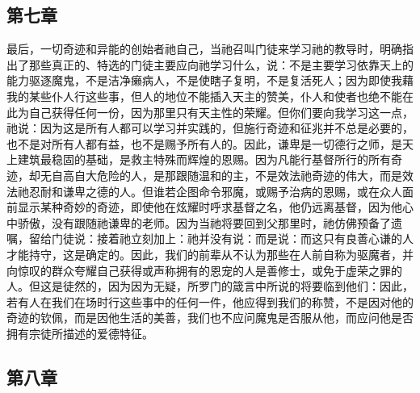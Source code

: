 
\subsection{第七章}

\par

最后，一切奇迹和异能的创始者祂自己，当祂召叫门徒来学习祂的教导时，明确指出了那些真正的、特选的门徒主要应向祂学习什么，说：不是主要学习依靠天上的能力驱逐魔鬼，不是洁净癞病人，不是使瞎子复明，不是复活死人；因为即使我藉我的某些仆人行这些事，但人的地位不能插入天主的赞美，仆人和使者也绝不能在此为自己获得任何一份，因为那里只有天主性的荣耀。但你们要向我学习这一点，祂说：因为这是所有人都可以学习并实践的，但施行奇迹和征兆并不总是必要的，也不是对所有人都有益，也不是赐予所有人的。因此，谦卑是一切德行之师，是天上建筑最稳固的基础，是救主特殊而辉煌的恩赐。因为凡能行基督所行的所有奇迹，却无自高自大危险的人，是那跟随温和的主，不是效法祂奇迹的伟大，而是效法祂忍耐和谦卑之德的人。但谁若企图命令邪魔，或赐予治病的恩赐，或在众人面前显示某种奇妙的奇迹，即使他在炫耀时呼求基督之名，他仍远离基督，因为他心中骄傲，没有跟随祂谦卑的老师。因为当祂将要回到父那里时，祂仿佛预备了遗嘱，留给门徒说：接着祂立刻加上：祂并没有说：而是说：而这只有良善心谦的人才能持守，这是确定的。因此，我们的前辈从不认为那些在人前自称为驱魔者，并向惊叹的群众夸耀自己获得或声称拥有的恩宠的人是善修士，或免于虚荣之罪的人。但这是徒然的，因为因为无疑，所罗门的箴言中所说的将要临到他们：因此，若有人在我们在场时行这些事中的任何一件，他应得到我们的称赞，不是因对他的奇迹的钦佩，而是因他生活的美善，我们也不应问魔鬼是否服从他，而应问他是否拥有宗徒所描述的爱德特征。\par


\subsection{第八章}

